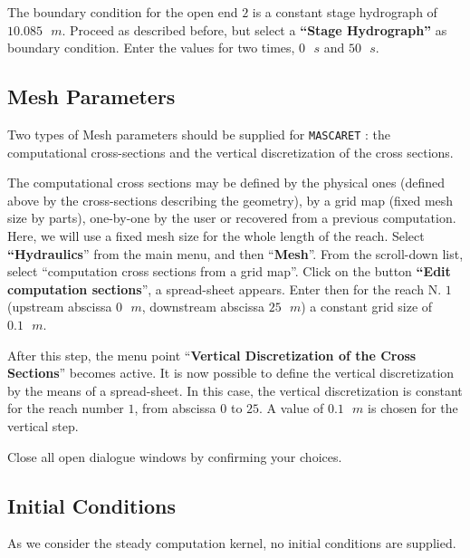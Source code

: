 \documentclass[a4paper,12pt]{article}
\begin{document}
The boundary condition for the open end $2$ is a constant stage hydrograph
of $10.085\mbox{ }m$. Proceed as described before, but select a \textbf{{}``Stage
Hydrograph''} as boundary condition. Enter the values for two times,
$0\mbox{ }s$ and $50\mbox{ }s$.


\subsection{Mesh Parameters }

\hspace{0.5cm}Two types of Mesh parameters should be supplied for \texttt{MASCARET} : the
computational cross-sections and the vertical discretization of the
cross sections. 

\vspace{0.5cm}

The computational cross sections may be defined by the physical ones
(defined above by the cross-sections describing the geometry), by
a grid map (fixed mesh size by parts), one-by-one by the user or recovered
from a previous computation. Here, we will use a fixed mesh size for
the whole length of the reach. Select \textbf{{}``Hydraulics}''
from the main menu, and then {}``\textbf{Mesh}''. From the scroll-down
list, select {}``computation cross sections from a grid map''. Click
on the button \textbf{{}``Edit computation sections}'', a spread-sheet
appears. Enter then for the reach N. $1$ (upstream abscissa $0\mbox{ }m$, downstream
abscissa $25\mbox{ }m$) a constant grid size of $0.1\mbox{ }m$. 

\vspace{0.5cm}

After this step, the menu point {}``\textbf{Vertical Discretization
of the Cross Sections}'' becomes active. It is now possible to define
the vertical discretization by the means of a spread-sheet. In this
case, the vertical discretization is constant for the reach number
$1$, from abscissa $0$ to $25$. A value of $0.1\mbox{ }m$ is chosen for the vertical
step.

\vspace{0.5cm}

Close all open dialogue windows by confirming your choices.


\subsection{Initial Conditions}

\hspace{0.5cm}As we consider the steady computation kernel, no initial conditions
are supplied.
\end{document}
